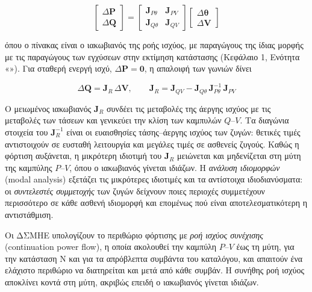 \begin{equation}
\begin{bmatrix} \Delta\mathbf{P} \\ \Delta\mathbf{Q} \end{bmatrix} =
\begin{bmatrix} \mathbf{J}_{P\theta} & \mathbf{J}_{PV} \\
                \mathbf{J}_{Q\theta} & \mathbf{J}_{QV} \end{bmatrix}
\begin{bmatrix} \Delta\boldsymbol{\theta} \\ \Delta\mathbf{V} \end{bmatrix}
\label{eq:pf-jacobian}
\end{equation}

όπου ο πίνακας είναι ο ιακωβιανός της ροής ισχύος, με παραγώγους της ίδιας μορφής με τις
παραγώγους των εγχύσεων στην εκτίμηση κατάστασης (Κεφάλαιο 1, Ενότητα «»).
Για σταθερή ενεργή ισχύ, $\Delta\mathbf{P} = \mathbf{0}$, η απαλοιφή των γωνιών δίνει

\begin{equation}
\Delta\mathbf{Q} = \mathbf{J}_R\,\Delta\mathbf{V}, \qquad
\mathbf{J}_R = \mathbf{J}_{QV} - \mathbf{J}_{Q\theta}\,\mathbf{J}_{P\theta}^{-1}\,\mathbf{J}_{PV}
\label{eq:jr}
\end{equation}

Ο μειωμένος ιακωβιανός $\mathbf{J}_R$ συνδέει τις μεταβολές της άεργης ισχύος με τις
μεταβολές των τάσεων και γενικεύει την κλίση των καμπυλών $Q$--$V$. Τα διαγώνια στοιχεία του
$\mathbf{J}_R^{-1}$ είναι οι ευαισθησίες τάσης--άεργης ισχύος των ζυγών: θετικές τιμές
αντιστοιχούν σε ευσταθή λειτουργία και μεγάλες τιμές σε ασθενείς ζυγούς. Καθώς η φόρτιση
αυξάνεται, η μικρότερη ιδιοτιμή του $\mathbf{J}_R$ μειώνεται και μηδενίζεται στη μύτη της
καμπύλης $P$--$V$, όπου ο ιακωβιανός γίνεται ιδιάζων. Η \emph{ανάλυση ιδιομορφών} (modal
analysis) εξετάζει τις μικρότερες ιδιοτιμές και τα αντίστοιχα ιδιοδιανύσματα: οι
\emph{συντελεστές συμμετοχής} των ζυγών δείχνουν ποιες περιοχές συμμετέχουν περισσότερο σε
κάθε ασθενή ιδιομορφή και επομένως πού είναι αποτελεσματικότερη η αντιστάθμιση.

Οι ΔΣΜΗΕ υπολογίζουν το περιθώριο φόρτισης με \emph{ροή ισχύος συνέχισης} (continuation
power flow), η οποία ακολουθεί την καμπύλη $P$--$V$ έως τη μύτη, για την κατάσταση N και για τα
απρόβλεπτα συμβάντα του καταλόγου, και απαιτούν ένα ελάχιστο περιθώριο να διατηρείται και μετά
από κάθε συμβάν. Η συνήθης ροή ισχύος αποκλίνει κοντά στη μύτη, ακριβώς επειδή ο ιακωβιανός
γίνεται ιδιάζων.

